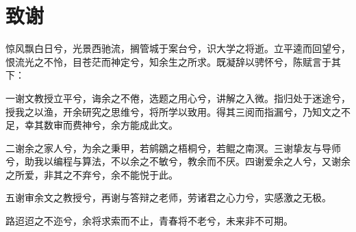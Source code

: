 
\chapter*{致谢}

\songti\sihao
{%
惊风飘白日兮，光景西驰流，搁管城于案台兮，识大学之将逝。立平逵而回望兮，恨流光之不怜，目苍茫而神定兮，知余生之所求。既凝辞以骋怀兮，陈赋言于其下：

一谢文教授立平兮，诲余之不倦，选题之用心兮，讲解之入微。指归处于迷途兮，授我之以渔，开余研究之思维兮，将所学以致用。得其三阅而指漏兮，乃知文之不足，幸其数审而费神兮，余方能成此文。

二谢余之家人兮，为余之秉甲，若鹓鶵之梧桐兮，若鲲之南溟。三谢挚友与导师兮，助我以编程与算法，不以余之不敏兮，教余而不厌。四谢爱余之人兮，又谢余之所爱，非其之不弃兮，余不能悦于此。

五谢审余文之教授兮，再谢与答辩之老师，劳诸君之心力兮，实感激之无极。

路迢迢之不迩兮，余将求索而不止，青春将不老兮，未来非不可期。
}
\


